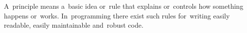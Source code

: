 A~principle means a~basic idea or~rule that explains or~controls how something happens or~works.
In~programming there exist such rules for~writing easily readable, easily maintainable and~robust code.

